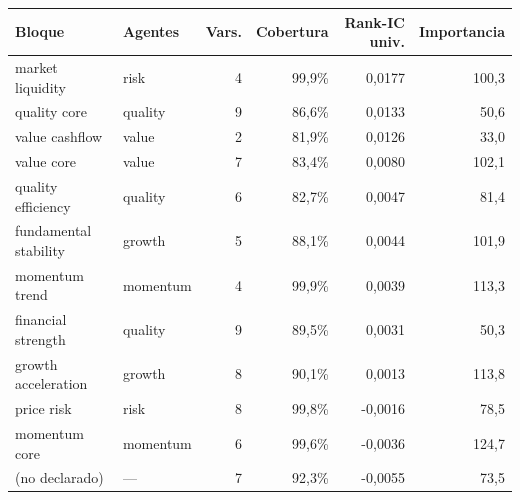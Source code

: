 \begin{tabular}{llrrrr}
\toprule
Bloque & Agentes & Vars. & Cobertura & Rank-IC univ. & Importancia \\
\midrule
market liquidity & risk & 4 & 99,9\% & 0,0177 & 100,3 \\
quality core & quality & 9 & 86,6\% & 0,0133 & 50,6 \\
value cashflow & value & 2 & 81,9\% & 0,0126 & 33,0 \\
value core & value & 7 & 83,4\% & 0,0080 & 102,1 \\
quality efficiency & quality & 6 & 82,7\% & 0,0047 & 81,4 \\
fundamental stability & growth & 5 & 88,1\% & 0,0044 & 101,9 \\
momentum trend & momentum & 4 & 99,9\% & 0,0039 & 113,3 \\
financial strength & quality & 9 & 89,5\% & 0,0031 & 50,3 \\
growth acceleration & growth & 8 & 90,1\% & 0,0013 & 113,8 \\
price risk & risk & 8 & 99,8\% & -0,0016 & 78,5 \\
momentum core & momentum & 6 & 99,6\% & -0,0036 & 124,7 \\
(no declarado) & — & 7 & 92,3\% & -0,0055 & 73,5 \\
\bottomrule
\end{tabular}
